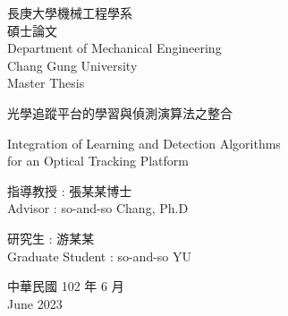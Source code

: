 
	
	\EnableCoverPageStyle
	
	\begin{center}
		{\fontsize{18}{27}\selectfont 長庚大學機械工程學系} \\
		
		\vspace{0.5cm}
		{\fontsize{18}{27}\selectfont 碩士論文} \\
		
		\vspace{0.5cm}
		{\fontsize{14}{21}\selectfont Department of Mechanical Engineering} \\
		
		\vspace{0.5cm}
		{\fontsize{16}{24}\selectfont Chang Gung University} \\
		
		\vspace{0.5cm}
		{\fontsize{16}{24}\selectfont Master Thesis}
	\end{center}
	
	\vspace{2.5cm}
	
	\begin{center}
    	{\fontsize{18}{27}\selectfont 光學追蹤平台的學習與偵測演算法之整合}

    	\vspace{1cm}

    	{\fontsize{18}{27}\selectfont Integration of Learning and Detection Algorithms} \\
    	\vspace{0.5cm}
    	{\fontsize{18}{27}\selectfont for an Optical Tracking Platform}
  	\end{center}
	
	\vspace{1.5cm}
	
	\begin{center}
		{\fontsize{18}{27}\selectfont 指導教授 : 張某某博士} \\
		\vspace{0.5cm}
		{\fontsize{18}{27}\selectfont Advisor : so-and-so Chang, Ph.D}
	\end{center}
	
	\vspace{1cm}
	
	\begin{center}
		{\fontsize{18}{27}\selectfont 研究生 : 游某某} \\
		\vspace{0.5cm}
		{\fontsize{18}{27}\selectfont Graduate Student : so-and-so YU}
	\end{center}	
	
	\vspace{1cm}
	
	\begin{center}
		{\fontsize{18}{27}\selectfont 中華民國 102 年 6 月} \\
		\vspace{0.5cm}
		{\fontsize{18}{27}\selectfont June 2023}
	\end{center}
	
	\DisableCoverPageStyle

